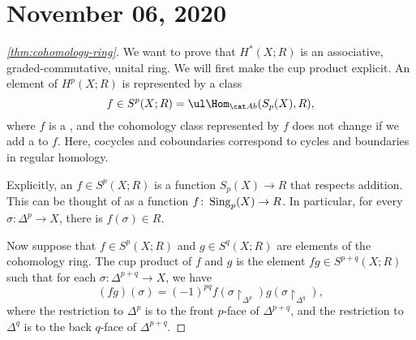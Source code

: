 \documentclass{standalone}
\begin{document}
\chapter{November 06, 2020}

\begin{proof}[\cref{thm:cohomology-ring}]
  We want to prove that \(H^*(X; R)\) is an
    associative, graded-commutative, unital ring.
  We will first make the cup product explicit.
  An element of \(H^p(X; R)\) is represented by a class
  \[
    f \in S^p(X; R) = \ul\Hom_{\cAb}(S_p(X), R),
  \]
  where \(f\) is a ,
  and the cohomology class represented by \(f\)
  does not change if we add a  to \(f\).
  Here, cocycles and coboundaries correspond to cycles and boundaries
  in regular homology.

  Explicitly, an \(f \in S^p(X; R)\) is a function \(S_p(X) \to R\)
  that respects addition. This can be thought of as a function
  \(f \colon \operatorname{Sing}_p(X) \to R\).
  In particular, for every \(\sigma \colon \Delta^p \to X\),
  there is \(f(\sigma) \in R\).

  Now suppose that \(f \in S^p(X; R)\) and \(g \in S^q(X; R)\)
  are elements of the cohomology ring.
  The cup product of \(f\) and \(g\) is the element \(fg \in S^{p+q}(X; R)\)
  such that for each \(\sigma \colon \Delta^{p+q} \to X\), we have
  \[
    (fg)(\sigma) =
      (-1)^{pq} f(\sigma{\restriction}_{\Delta^p})
                g(\sigma{\restriction}_{\Delta^q}),
  \]
  where the restriction to \(\Delta^p\) is to
  the front \(p\)-face of \(\Delta^{p+q}\), and
  the restriction to \(\Delta^q\) is to
  the back \(q\)-face of \(\Delta^{p+q}\).


\end{proof}
\end{document}
